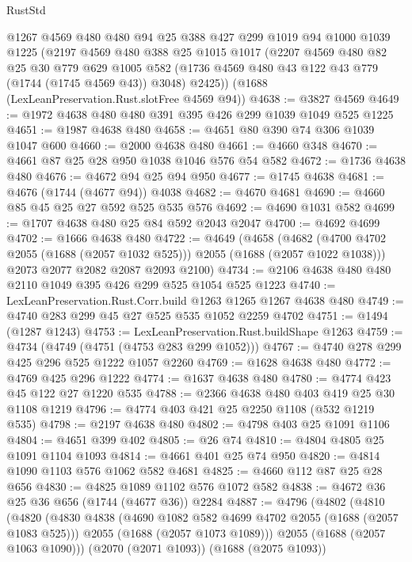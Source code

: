 \begin{lexlean}{RustStd}
\begin{coremodule}
    @1267
    @4569
    @480
    @480
    @94
    @25
    @388
    @427
    @299
    @1019
    @94
    @1000
    @1039
    @1225
    (@2197
      @4569
      @480
      @388
      @25
      @1015
      @1017
      (@2207
        @4569
        @480
        @82
        @25
        @30
        @779
        @629
        @1005
        @582
        (@1736 @4569 @480 @43 @122 @43 @779 (@1744 (@1745 @4569 @43)) @3048)
        @2425))
    (@1688 (LexLeanPreservation.Rust.slotFree @4569 @94))
@4638 := @3827 @4569
@4649 := @1972 @4638 @480 @480 @391 @395 @426 @299 @1039 @1049 @525 @1225
@4651 := @1987 @4638 @480
@4658 := @4651 @80 @390 @74 @306 @1039 @1047 @600
@4660 := @2000 @4638 @480
@4661 := @4660 @348
@4670 := @4661 @87 @25 @28 @950 @1038 @1046 @576 @54 @582
@4672 := @1736 @4638 @480
@4676 := @4672 @94 @25 @94 @950
@4677 := @1745 @4638
@4681 := @4676 (@1744 (@4677 @94)) @4038
@4682 := @4670 @4681
@4690 := @4660 @85 @45 @25 @27 @592 @525 @535 @576
@4692 := @4690 @1031 @582
@4699 := @1707 @4638 @480 @25 @84 @592 @2043 @2047
@4700 := @4692 @4699
@4702 := @1666 @4638 @480
@4722 := @4649
    (@4658
      (@4682 (@4700 @4702 @2055 (@1688 (@2057 @1032 @525))) @2055 (@1688 (@2057 @1022 @1038)))
      @2073
      @2077
      @2082
      @2087
      @2093
      @2100)
@4734 := @2106 @4638 @480 @480 @2110 @1049 @395 @426 @299 @525 @1054 @525 @1223
@4740 := LexLeanPreservation.Rust.Corr.build @1263 @1265 @1267 @4638 @480
@4749 := @4740 @283 @299 @45 @27 @525 @535 @1052 @2259 @4702
@4751 := @1494 (@1287 @1243)
@4753 := LexLeanPreservation.Rust.buildShape @1263
@4759 := @4734 (@4749 (@4751 (@4753 @283 @299 @1052)))
@4767 := @4740 @278 @299 @425 @296 @525 @1222 @1057 @2260
@4769 := @1628 @4638 @480
@4772 := @4769 @425 @296 @1222
@4774 := @1637 @4638 @480
@4780 := @4774 @423 @45 @122 @27 @1220 @535
@4788 := @2366 @4638 @480 @403 @419 @25 @30 @1108 @1219
@4796 := @4774 @403 @421 @25 @2250 @1108 (@532 @1219 @535)
@4798 := @2197 @4638 @480
@4802 := @4798 @403 @25 @1091 @1106
@4804 := @4651 @399 @402
@4805 := @26 @74
@4810 := @4804 @4805 @25 @1091 @1104 @1093
@4814 := @4661 @401 @25 @74 @950
@4820 := @4814 @1090 @1103 @576 @1062 @582 @4681
@4825 := @4660 @112 @87 @25 @28 @656
@4830 := @4825 @1089 @1102 @576 @1072 @582
@4838 := @4672 @36 @25 @36 @656 (@1744 (@4677 @36)) @2284
@4887 := @4796
    (@4802
      (@4810
        (@4820
          (@4830
            @4838
            (@4690 @1082 @582 @4699 @4702 @2055 (@1688 (@2057 @1083 @525)))
            @2055
            (@1688 (@2057 @1073 @1089)))
          @2055
          (@1688 (@2057 @1063 @1090)))
        (@2070 (@2071 @1093))
        (@1688 (@2075 @1093))

\end{coremodule}
\end{lexlean}
